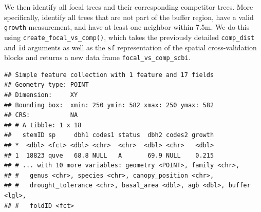 \documentclass[12pt]{article}
\newenvironment{Shaded}{\begin{snugshade}}{\end{snugshade}}
\newcommand{\CommentTok}[1]{\textcolor[rgb]{0.56,0.35,0.01}{\textit{#1}}}
\newcommand{\DataTypeTok}[1]{\textcolor[rgb]{0.13,0.29,0.53}{#1}}
\newcommand{\KeywordTok}[1]{\textcolor[rgb]{0.13,0.29,0.53}{\textbf{#1}}}
\newcommand{\NormalTok}[1]{#1}
\newcommand{\OperatorTok}[1]{\textcolor[rgb]{0.81,0.36,0.00}{\textbf{#1}}}
\newcommand{\StringTok}[1]{\textcolor[rgb]{0.31,0.60,0.02}{#1}}
\begin{document}
We then identify all focal trees and their corresponding competitor
trees. More specifically, identify all trees that are not part of the
buffer region, have a valid \texttt{growth} measurement, and have at
least one neighbor within 7.5m. We do this using
\texttt{create\_focal\_vs\_comp()}, which takes the previously detailed
\texttt{comp\_dist} and \texttt{id} arguments as well as the \texttt{sf}
representation of the spatial cross-validation blocks and returns a new
data frame \texttt{focal\_vs\_comp\_scbi}.

\begin{Shaded}
\end{Shaded}

\begin{verbatim}
## Simple feature collection with 1 feature and 17 fields
## Geometry type: POINT
## Dimension:     XY
## Bounding box:  xmin: 250 ymin: 582 xmax: 250 ymax: 582
## CRS:           NA
## # A tibble: 1 x 18
##   stemID sp     dbh1 codes1 status  dbh2 codes2 growth
## *  <dbl> <fct> <dbl> <chr>  <chr>  <dbl> <chr>   <dbl>
## 1  18823 quve   68.8 NULL   A       69.9 NULL    0.215
## # ... with 10 more variables: geometry <POINT>, family <chr>,
## #   genus <chr>, species <chr>, canopy_position <chr>,
## #   drought_tolerance <chr>, basal_area <dbl>, agb <dbl>, buffer <lgl>,
## #   foldID <fct>
\end{verbatim}
\end{document}
